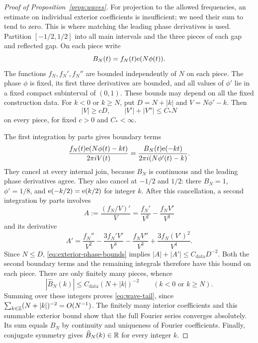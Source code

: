 \begin{proof}[Proof of Proposition~\ref{prop:waves}]
For projection to the allowed frequencies, an estimate on individual
exterior coefficients is insufficient; we need their sum to tend to
zero.  This is where matching the leading phase derivatives is used.
Partition $[-1/2,1/2]$ into all main intervals and the three pieces of each
gap and reflected gap.  On each piece write
\[
 B_N(t)=f_N(t)\mathrm e(N\phi(t)).
\]
The functions $f_N,f_N',f_N''$ are bounded independently of $N$ on each
piece.  The phase $\phi$ is fixed, its first three derivatives are
bounded, and all values of $\phi'$ lie in a fixed compact subinterval of
$(0,1)$.  These bounds may depend on all the fixed construction data.
For $k<0$ or $k\ge N$, put $D=N+|k|$ and $V=N\phi'-k$.  Then
\begin{equation}\label{eq:exterior-phase-bounds}
 |V|\ge cD,\qquad |V'|+|V''|\le C_*N
\end{equation}
on every piece, for fixed $c>0$ and $C_*<\infty$.

The first integration by parts gives boundary terms
\[
 \frac{f_N(t)\mathrm e(N\phi(t)-kt)}{2\pi iV(t)}
 =\frac{B_N(t)\mathrm e(-kt)}{2\pi i(N\phi'(t)-k)}.
\]
They cancel at every internal join, because $B_N$ is continuous and the
leading phase derivatives agree.  They also cancel at $-1/2$ and $1/2$:
there $B_N=1$, $\phi'=1/8$, and
$\mathrm e(-k/2)=\mathrm e(k/2)$ for integer $k$.
After this cancellation, a second integration by parts involves
\[
 A:=\frac{(f_N/V)'}{V}
 =\frac{f_N'}{V^2}-\frac{f_NV'}{V^3}
\]
and its derivative
\[
 A'=\frac{f_N''}{V^2}
 -\frac{3f_N'V'}{V^3}
 -\frac{f_NV''}{V^3}
 +\frac{3f_N(V')^2}{V^4}.
\]
Since $N\le D$, \eqref{eq:exterior-phase-bounds} implies
$|A|+|A'|\le C_{\mathrm{data}}D^{-2}$.  Both the second boundary terms
and the remaining integrals therefore have this bound on each piece.
There are only finitely many pieces, whence
\[
 |\widehat B_N(k)|\le C_{\mathrm{data}}(N+|k|)^{-2}
 \qquad(k<0\text{ or }k\ge N).
\]
Summing over these integers proves \eqref{eq:wave-tail}, since
$\sum_{k\in\mathbb Z}(N+|k|)^{-2}=O(N^{-1})$.
The finitely many interior coefficients and this summable exterior bound
show that the full Fourier series converges absolutely.  Its sum equals
$B_N$ by continuity and uniqueness of Fourier coefficients.  Finally,
conjugate symmetry gives $\widehat B_N(k)\in\mathbb R$ for every integer $k$.
\end{proof}
